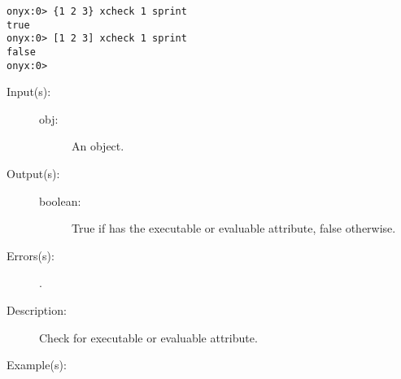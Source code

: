 \begin{description}
\begin{description}
\begin{verbatim}
onyx:0> {1 2 3} xcheck 1 sprint
true
onyx:0> [1 2 3] xcheck 1 sprint
false
onyx:0>
		\end{verbatim}
	\end{description}
\label{systemdict:xecheck}
\item[{\onyxop{obj}{xecheck}{boolean}}: ]
	\begin{description}\item[]
	\item[Input(s): ]
		\begin{description}\item[]
		\item[obj: ]
			An object.
		\end{description}
	\item[Output(s): ]
		\begin{description}\item[]
		\item[boolean: ]
			True if  has the executable or evaluable
			attribute, false otherwise.
		\end{description}
	\item[Errors(s): ]
		\begin{description}\item[]
		\item[.]
		\end{description}
	\item[Description: ]
		Check  for executable or evaluable attribute.
	\item[Example(s): ]\begin{verbatim}


\end{verbatim}
\end{description}
\end{description}
